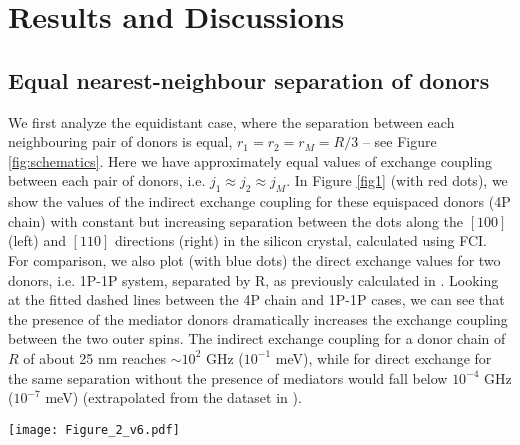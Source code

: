 \documentclass[%
showkeys,
 amsmath,amssymb,
 aps,
prb,
]{revtex4-2}
\begin{document}
\section{Results and Discussions}
\subsection{Equal nearest-neighbour separation of donors}

We first analyze the equidistant case, where the separation between each neighbouring pair of donors is equal, $r_1=r_2=r_M=R/3$ -- see Figure \ref{fig:schematics}. Here we have approximately equal values of exchange coupling between each pair of donors, i.e. $j_1 \approx j_2 \approx j_M$. In Figure \ref{fig1} (with red dots), we show the values of the indirect exchange coupling for these equispaced donors (4P chain) with constant but increasing separation between the dots along the $[100]$ (left) and $[110]$ directions (right) in the silicon crystal, calculated using FCI. For comparison, we also plot (with blue dots) the direct exchange values for two donors, i.e. 1P-1P system, separated by R, as previously calculated in \cite{wangHighlyTunableExchange2016a}. Looking at the fitted dashed lines between the 4P chain and 1P-1P cases, we can see that the presence of the mediator donors dramatically increases the exchange coupling between the two outer spins. The indirect exchange coupling for a donor chain of $R$ of about 25 nm reaches $\sim10^{2}$ GHz ($10^{-1}$ meV), while for direct exchange for the same separation without the presence of mediators would fall below $10^{-4}$ GHz ($10^{-7}$ meV) (extrapolated from the dataset in \cite{wangHighlyTunableExchange2016a}). 

\begin{figure*}[tb!]
    \centering
    \texttt{[image: Figure\_2\_v6.pdf]}
    \caption{\textbf{Comparison of indirect and direct exchange coupling of 1P donors in silicon calculated using atomistic FCI (a)} Comparison of indirect exchange (4P chain) of the end-spins (red dots) with nearest-neighbour exchange coupling (1P-1P) (blue dots, replicated from \cite{wangHighlyTunableExchange2016a}) along the $[100]$ direction. Dashed lines provide linear fits to both data sets. Here we see that the indirect exchange is higher than the nearest-neighbour exchange, with the exponential dependence with separation being less steep for indirect coupling. \textbf{(b)} Same as (a) but along the $[110]$ direction. Here we see a similar trend in terms of the comparison between direct and indirect exchange as for the $[100]$ direction. However, we also observe oscillations in the exchange coupling along this crystalline orientation due to valley quantum interference.}
    \label{fig1}
\end{figure*}
\end{document}
